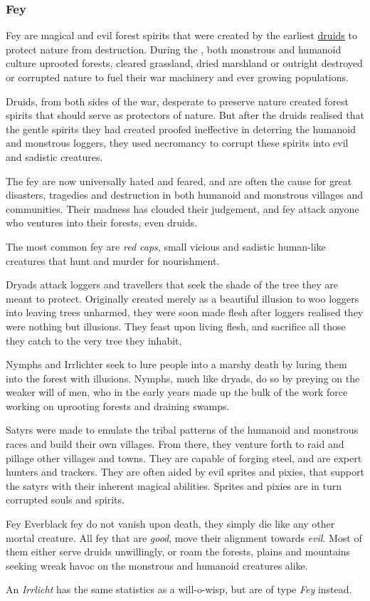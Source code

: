 \subsubsection{Fey}
\label{sec:Fey}

Fey are magical and evil forest spirits that were created by the
earliest \hyperref[sec:Druids]{druids} to protect nature from
destruction. During the , both monstrous and humanoid
culture uprooted forests, cleared grassland, dried marshland or outright
destroyed or corrupted nature to fuel their war machinery and ever growing
populations.

Druids, from both sides of the war, desperate to preserve nature created
forest spirits that should serve as protectors of nature. But after the druids
realised that the gentle spirits they had created proofed ineffective in
deterring the humanoid and monstrous loggers, they used necromancy to corrupt
these spirits into evil and sadistic creatures.

The fey are now universally hated and feared, and are often the cause for
great disasters, tragedies and destruction in both humanoid and monstrous
villages and communities. Their madness has clouded their judgement, and fey
attack anyone who ventures into their forests, even druids.

The most common fey are \emph{red caps}, small vicious and sadistic
human-like creatures that hunt and murder for nourishment.

Dryads attack loggers and travellers that seek the shade of the tree they are
meant to protect. Originally created merely as a beautiful illusion to woo
loggers into leaving trees unharmed, they were soon made flesh after loggers
realised they were nothing but illusions. They feast upon living flesh, and
sacrifice all those they catch to the very tree they inhabit.

Nymphs and Irrlichter seek to lure people into a marshy death by luring them
into the forest with illusions. Nymphs, much like dryads, do so by preying on
the weaker will of men, who in the early years made up the bulk of the work
force working on uprooting forests and draining swamps.

Satyrs were made to emulate the tribal patterns of the humanoid and monstrous
races and build their own villages. From there, they venture forth to raid and
pillage other villages and towns. They are capable of forging steel, and are
expert hunters and trackers. They are often aided by evil sprites and pixies,
that support the satyrs with their inherent magical abilities. Sprites and
pixies are in turn corrupted souls and spirits.

\begin{35e}{Fey}
  Everblack fey do not vanish upon death, they simply die like any other
  mortal creature. All fey that are \emph{good}, move their alignment towards
  \emph{evil}. Most of them either serve druids unwillingly, or roam the
  forests, plains and mountains seeking wreak havoc on the monstrous and
  humanoid creatures alike.

  An \emph{Irrlicht} has the same statistics as a will-o-wisp, but are of
  type \emph{Fey} instead.
\end{35e}
